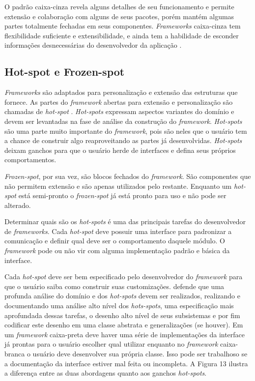 O padrão caixa-cinza revela alguns detalhes de seu funcionamento e permite extensão e colaboração com alguns de seus pacotes, porém mantém algumas partes totalmente fechadas em seus componentes. \textit{Frameworks} caixa-cinza tem flexibilidade suficiente e extensibilidade, e ainda tem a habilidade de esconder informações desnecessárias do desenvolvedor da aplicação \cite{Fayad1999}.

\subsection{Hot-spot e Frozen-spot}

\textit{Frameworks} são adaptados para personalização e extensão das estruturas que fornece. As partes do \textit{framework} abertas para extensão e personalização são chamadas de \textit{hot-spot} \cite{Fayad1999}. \textit{Hot-spots} expressam aspectos variantes do domínio e devem ser levantadas na fase de análise da construção do \textit{framework}. \textit{Hot-spots} são uma parte muito importante do \textit{framework}, pois são neles que o usuário tem a chance de construir algo reaproveitando as partes já desenvolvidas. \textit{Hot-spots} deixam ganchos para que o usuário herde de interfaces e defina seus próprios comportamentos.

\textit{Frozen-spot}, por sua vez, são blocos fechados do \textit{framework}. São componentes que não permitem extensão e são apenas utilizados pelo restante. Enquanto um \textit{hot-spot} está semi-pronto o \textit{frozen-spot} já está pronto para uso e não pode ser alterado.

Determinar quais são os \textit{hot-spots} é uma das principais tarefas do desenvolvedor de \textit{frameworks}. Cada \textit{hot-spot} deve possuir uma interface para padronizar a comunicação e definir qual deve ser o comportamento daquele módulo. O \textit{framework} pode ou não vir com alguma implementação padrão e básica da interface.

Cada \textit{hot-spot} deve ser bem especificado pelo desenvolvedor do \textit{framework} para que o usuário saiba como construir suas customizações. \cite{Fayad1999} defende que uma profunda análise do domínio e dos \textit{hot-spots} devem ser realizados, realizando e documentando uma análise alto nível dos \textit{hots-spots}, uma especificação mais aprofundada dessas tarefas, o desenho alto nível de seus subsistemas e por fim codificar este desenho em uma classe abstrata e generalizações (se houver). Em um \textit{framework} caixa-preta deve haver uma série de implementações da interface já prontas para o usuário escolher qual utilizar enquanto no \textit{framework} caixa-branca o usuário deve desenvolver sua própria classe. Isso pode ser trabalhoso se a documentação da interface estiver mal feita ou incompleta. A Figura 13 ilustra a diferença entre as duas abordagens quanto aos ganchos \textit{hot-spots}.

